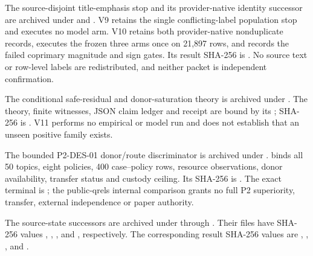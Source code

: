 The source-disjoint title-emphasis stop and its provider-native identity
successor are archived under
 and
. V9
retains the single conflicting-label population stop and executes no model arm.
V10 retains both provider-native nonduplicate records, executes the frozen
three arms once on 21,897 rows, and records the failed coprimary magnitude and
sign gates. Its result SHA-256 is
.
No source text or row-level labels are redistributed, and neither packet is
independent confirmation.

The conditional safe-residual and donor-saturation theory is archived under
. The theory,
finite witnesses, JSON claim ledger and receipt are bound by its
;  SHA-256 is
.
V11 performs no empirical or model run and does not establish that an unseen
positive family exists.

The bounded P2-DES-01 donor/route discriminator is archived under
.
 binds all 50 topics, eight policies, 400
case--policy rows, resource observations, donor availability, transfer status
and custody ceiling.  Its SHA-256 is
.
The exact terminal is
; the public-qrels
internal comparison grants no full P2 superiority, transfer, external
independence or paper authority.

The source-state successors are archived under
 through
.  Their
 files have SHA-256 values
,
,
,
and
,
respectively.  The corresponding result SHA-256 values are
,
,
,
and
.

